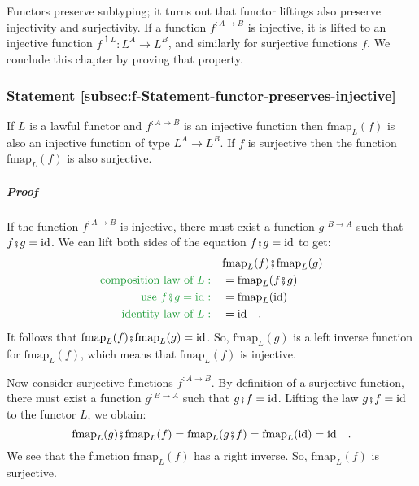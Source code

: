 Functors preserve subtyping; it turns out that functor liftings also
preserve injectivity and surjectivity. If a function $f^{:A\rightarrow B}$
is injective, it is lifted to an injective function $f^{\uparrow L}:L^{A}\rightarrow L^{B}$,
and similarly for surjective functions $f$. We conclude this chapter
by proving that property.

\subsubsection{Statement \label{subsec:f-Statement-functor-preserves-injective}\ref{subsec:f-Statement-functor-preserves-injective}}

If $L$ is a lawful functor and $f^{:A\rightarrow B}$ is an injective
function then $\text{fmap}_{L}(f)$ is also an injective function
of type $L^{A}\rightarrow L^{B}$. If $f$ is surjective then the
function $\text{fmap}_{L}(f)$ is also surjective.

\subparagraph{Proof}

If the function $f^{:A\rightarrow B}$ is injective, there must exist
a function $g^{:B\rightarrow A}$ such that $f\bef g=\text{id}$.
We can lift both sides of the equation $f\bef g=\text{id}$ to get:
\begin{align*}
 & \text{fmap}_{L}(f)\bef\text{fmap}_{L}(g)\\
{\color{greenunder}\text{composition law of }L:}\quad & =\text{fmap}_{L}(f\bef g)\\
{\color{greenunder}\text{use }f\bef g=\text{id}:}\quad & =\text{fmap}_{L}(\text{id})\\
{\color{greenunder}\text{identity law of }L:}\quad & =\text{id}\quad.
\end{align*}
It follows that $\text{fmap}_{L}(f)\bef\text{fmap}_{L}(g)=\text{id}$.
So, $\text{fmap}_{L}(g)$ is a left inverse function for $\text{fmap}_{L}(f)$,
which means that $\text{fmap}_{L}(f)$ is injective.

Now consider surjective functions $f^{:A\rightarrow B}$. By definition
of a surjective function, there must exist a function $g^{:B\rightarrow A}$
such that $g\bef f=\text{id}$. Lifting the law $g\bef f=\text{id}$
to the functor $L$, we obtain:
\[
\text{fmap}_{L}(g)\bef\text{fmap}_{L}(f)=\text{fmap}_{L}(g\bef f)=\text{fmap}_{L}(\text{id})=\text{id}\quad.
\]
We see that the function $\text{fmap}_{L}(f)$ has a right inverse.
So, $\text{fmap}_{L}(f)$ is surjective.

